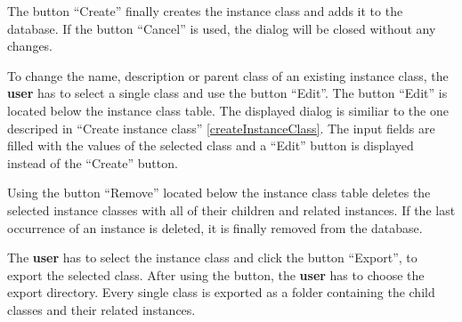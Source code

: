 The button ``Create'' finally creates the instance class and adds it to the \edacc database. \attention If the button ``Cancel'' is used, the dialog will be closed without any changes.

 To change the name, description or parent class of an existing instance class, the \textbf{user} has to select a single class and use the button ``Edit''. The button ``Edit'' is located below the instance class table. The displayed dialog is similiar to the one descriped in ``Create instance class'' \ref{createInstanceClass}. The input fields are filled with the values of the selected class and a ``Edit'' button is displayed instead of the ``Create'' button.

 Using the button ``Remove'' located below the instance class table deletes the selected instance classes with all of their children and related instances.  If the last occurrence of an instance is deleted, it is finally removed from the database.

 The \textbf{user} has to select the instance class and click the button ``Export'', to export the selected class. After using the button, the \textbf{user} has to choose the export directory. Every single class is exported as a folder containing the child classes and  their related instances.



